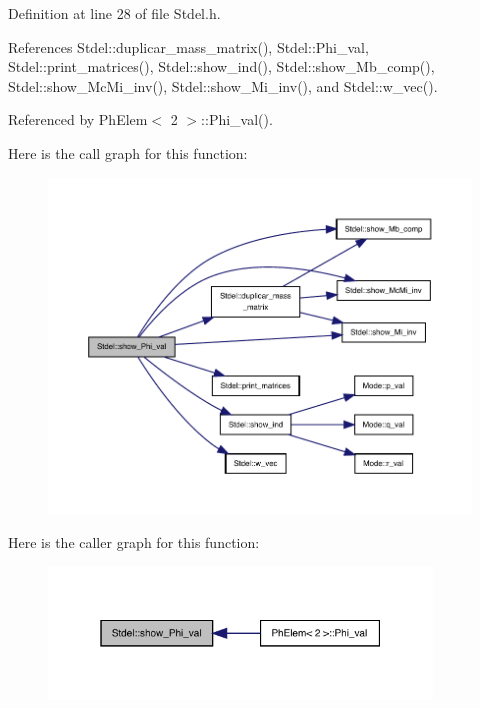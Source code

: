 Definition at line 28 of file Stdel.\+h.



References Stdel\+::duplicar\+\_\+mass\+\_\+matrix(), Stdel\+::\+Phi\+\_\+val, Stdel\+::print\+\_\+matrices(), Stdel\+::show\+\_\+ind(), Stdel\+::show\+\_\+\+Mb\+\_\+comp(), Stdel\+::show\+\_\+\+Mc\+Mi\+\_\+inv(), Stdel\+::show\+\_\+\+Mi\+\_\+inv(), and Stdel\+::w\+\_\+vec().



Referenced by Ph\+Elem$<$ 2 $>$\+::\+Phi\+\_\+val().

Here is the call graph for this function\+:
\nopagebreak
\begin{figure}[H]
\begin{center}
\leavevmode
\includegraphics[width=350pt]{classStdel_a6565c36150823a1f52a2daf05806f7a4_cgraph}
\end{center}
\end{figure}
Here is the caller graph for this function\+:
\nopagebreak
\begin{figure}[H]
\begin{center}
\leavevmode
\includegraphics[width=289pt]{classStdel_a6565c36150823a1f52a2daf05806f7a4_icgraph}
\end{center}
\end{figure}
\mbox{\label{classStdel_a56288a857b95a55c8b7eb5b473e836d9}} 
